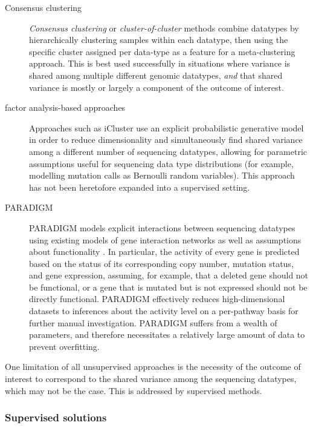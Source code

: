 \begin{description}
\item[Consensus clustering]
  \textit{Consensus clustering} or \textit{cluster-of-cluster} methods combine datatypes by hierarchically clustering samples within each datatype, then using the specific cluster assigned per data-type as a feature for a meta-clustering approach. This is best used successfully in situations where variance is shared among multiple different genomic datatypes, \textit{and} that shared variance is mostly or largely a component of the outcome of interest.

\item[factor analysis-based approaches] Approaches such as iCluster \cite{shen_integrative_2012}\cite{shen_integrative_2009} use an explicit probabilistic generative model in order to reduce dimensionality and simultaneously find shared variance among a different number of sequencing datatypes, allowing for parametric assumptions useful for sequencing data type distributions (for example, modelling mutation calls as Bernoulli random variables). This approach has not been heretofore expanded into a supervised setting.

  
\item[PARADIGM]
  PARADIGM models explicit interactions between sequencing datatypes using existing models of gene interaction networks as well as assumptions about functionality \cite{vaske_inference_2010} \cite{ng_paradigm-shift_2012}. In particular, the activity of every gene is predicted based on the status of its corresponding copy number, mutation status, and gene expression, assuming, for example, that a deleted gene should not be functional, or a gene that is mutated but is not expressed should not be directly functional.
  PARADIGM effectively reduces high-dimensional datasets to inferences about the activity level on a per-pathway basis for further manual investigation. 
  PARADIGM suffers from a wealth of parameters, and therefore necessitates a relatively large amount of data to prevent overfitting.   
\end{description}

One limitation of all unsupervised approaches is the necessity of the outcome of interest to correspond to the shared variance among the sequencing datatypes, which may not be the case. This is addressed by supervised methods. 



\subsubsection{Supervised solutions}


